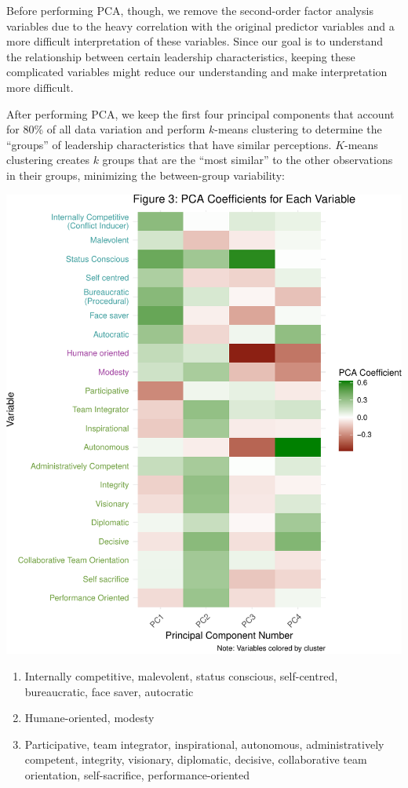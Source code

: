 \documentclass[
]{article}
\providecommand{\tightlist}{%
  \setlength{\itemsep}{0pt}\setlength{\parskip}{0pt}}
\begin{document}
Before performing PCA, though, we remove the second-order factor
analysis variables due to the heavy correlation with the original
predictor variables and a more difficult interpretation of these
variables. Since our goal is to understand the relationship between
certain leadership characteristics, keeping these complicated variables
might reduce our understanding and make interpretation more difficult.

After performing PCA, we keep the first four principal components that
account for 80\% of all data variation and perform \(k\)-means
clustering to determine the ``groups'' of leadership characteristics
that have similar perceptions. \(K\)-means clustering creates \(k\)
groups that are the ``most similar'' to the other observations in their
groups, minimizing the between-group variability:

\begin{center}\includegraphics[width=0.85\linewidth]{globe_report_files/figure-latex/pca_heatmap-1} \end{center}


\begin{enumerate}
\def\labelenumi{\arabic{enumi}.}
\tightlist
\item
  \textcolor{clust1}{Internally competitive, malevolent, status conscious, self-centred, bureaucratic, face saver, autocratic}
\item
  \textcolor{clust2}{Humane-oriented, modesty}
\item
  \textcolor{clust3}{Participative, team integrator, inspirational, autonomous, administratively competent, integrity, visionary, diplomatic, decisive, collaborative team orientation, self-sacrifice, performance-oriented}
\end{enumerate}
\end{document}
